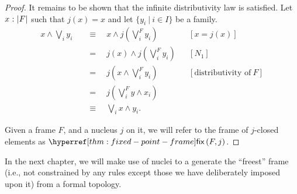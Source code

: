 \begin{proof}
  It remains to be shown that the infinite distributivity law is satisfied. Let
  $x\hspace{0.1mm}:\hspace{0.1mm}\left| F \right|$ such that $j(x) = x$ and let $\{ y_i ~|~ i \in I \}$ be a family.
  \begin{align*}
    x \wedge \bigvee_i y_i
      &\quad\equiv\quad x    \wedge j\left( \bigvee^F_i y_i \right)      && [x = j(x)]                     \\
      &\quad=\quad j(x) \wedge j\left( \bigvee^F_i y_i \right)      && [N_1]                          \\
      &\quad=\quad j \left( x \wedge \bigvee^F_i y_i \right)        && [\text{distributivity of}\ F]  \\
      &\quad=\quad j \left( \bigvee^F_i y \wedge x_i \right)                                      \\
      &\quad\equiv\quad \bigvee_i x \wedge y_i.
  \end{align*}

  Given a frame $F$, and a nucleus $j$ on it, we will refer to the frame of $j$-closed
  elements as $\fix{F}{j}$.
\end{proof}

In the next chapter, we will make use of nuclei to a generate the ``freest'' frame (i.e.,
not constrained by any rules except those we have deliberately imposed upon it) from a
formal topology.
